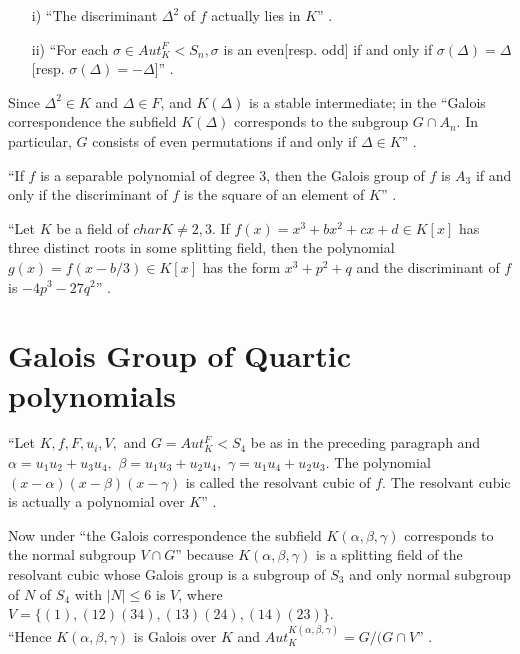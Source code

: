 \begin{theorem}
\begin{enumerate}
\item[i)] ``The discriminant \({\Delta}^2\) of \(f\) actually lies in \(K\)'' \cite{hunger}.
  \item[ii)] ``For each \(\sigma \in Aut_K^F < S_n, \sigma\) is an even[resp. odd] if and only if \(\sigma(\Delta) = \Delta\)[resp. \(\sigma(\Delta) = - \Delta\)]'' \cite{hunger}.
  \end{enumerate}
\end{theorem}
Since \({\Delta}^2 \in K\) and \(\Delta \in F\), and \(K(\Delta)\) is a stable intermediate; in the ``Galois correspondence the subfield \(K(\Delta)\) corresponds to the subgroup \(G \cap A_n\). In particular, \(G\) consists of even permutations if and only if \(\Delta \in K\)'' \cite{hunger}.

\begin{corollary}
  ``If \(f\) is a separable polynomial of degree \(3\), then the Galois group of \(f\) is \(A_3\) if and only if the discriminant of \(f\) is the square of an element of \(K\)'' \cite{hunger}.
\end{corollary}

\begin{theorem}
  ``Let \(K\) be a field of \(char K \neq 2,3 \). If \(f(x)=x^3+bx^2+cx+d \in K[x]\) has three distinct roots in some splitting field, then the polynomial \(g(x)=f(x-b/3) \in K[x]\) has the form \(x^3+p^2+q\) and the discriminant of \(f\) is \(-4p^3-27q^2\)'' \cite{hunger}.
\end{theorem}

\section{Galois Group of Quartic polynomials}
\begin{definition}
``Let \(K, f, F, u_i, V,\) and \(G=Aut_K^F<S_4\) be as in the preceding paragraph and \(\alpha=u_1u_2+u_3u_4,\) \(\beta=u_1u_3+u_2u_4,\) \(\gamma=u_1u_4+u_2u_3\).
The polynomial \( (x- \alpha)(x- \beta)(x- \gamma) \) is called the resolvant cubic of \(f\). The resolvant cubic is actually a polynomial over \(K\)'' \cite{hunger}.\\
\end{definition}
Now under ``the Galois correspondence the subfield \(K(\alpha, \beta, \gamma)\) corresponds to the normal subgroup \(V \cap G\)'' \cite{hunger} because \(K(\alpha,\beta,\gamma)\) is a splitting field of the resolvant cubic
whose Galois group is a subgroup of \(S_3\) and only normal subgroup of \(N\) of \(S_4\) with \(|N| \leq 6\) is \(V\), where \(V=\{(1),(12)(34),(13)(24),(14)(23)\}\).\\
``Hence \(K(\alpha, \beta, \gamma)\) is Galois over \(K\) and \(Aut_K^{K(\alpha, \beta, \gamma)} = G/(G \cap V\)'' \cite{hunger}.

